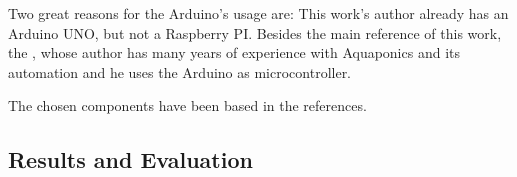 Two great reasons for the Arduino's usage are:
This work's author already has an Arduino UNO,
but not a Raspberry PI.
Besides the main reference of this work,
the \cite{Kretzinger2015},
whose author has many years of experience with Aquaponics and its automation and he uses the Arduino as microcontroller.

The chosen components have been based in the references.

\subsection{Results and Evaluation}
